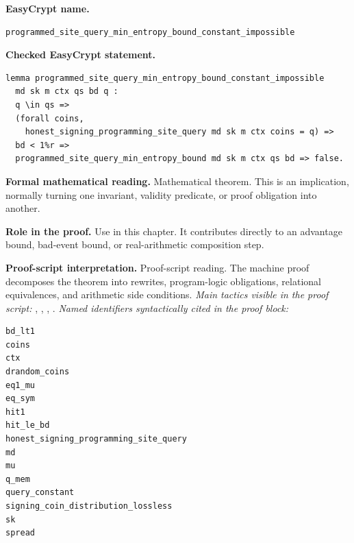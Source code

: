 \begin{formaltheorem}
\noindent\textbf{EasyCrypt name.}
\begin{lstlisting}[language=EasyCrypt,basicstyle=\ttfamily\scriptsize]
programmed_site_query_min_entropy_bound_constant_impossible
\end{lstlisting}
\noindent\textbf{Checked EasyCrypt statement.}
\begin{lstlisting}[language=EasyCrypt,basicstyle=\ttfamily\scriptsize]
lemma programmed_site_query_min_entropy_bound_constant_impossible
  md sk m ctx qs bd q :
  q \in qs =>
  (forall coins,
    honest_signing_programming_site_query md sk m ctx coins = q) =>
  bd < 1%r =>
  programmed_site_query_min_entropy_bound md sk m ctx qs bd => false.
\end{lstlisting}
\noindent\textbf{Formal mathematical reading.}
Mathematical theorem. This is an implication, normally turning one invariant, validity predicate, or proof obligation into another.

\noindent\textbf{Role in the proof.}
Use in this chapter. It contributes directly to an advantage bound, bad-event bound, or real-arithmetic composition step.

\noindent\textbf{Proof-script interpretation.}
Proof-script reading. The machine proof decomposes the theorem into rewrites, program-logic obligations, relational equivalences, and arithmetic side conditions.
\emph{Main tactics visible in the proof script:} , , , .
\emph{Named identifiers syntactically cited in the proof block:}
\begin{lstlisting}[language=EasyCrypt,basicstyle=\ttfamily\scriptsize]
bd_lt1
coins
ctx
drandom_coins
eq1_mu
eq_sym
hit1
hit_le_bd
honest_signing_programming_site_query
md
mu
q_mem
query_constant
signing_coin_distribution_lossless
sk
spread
\end{lstlisting}

\end{formaltheorem}

